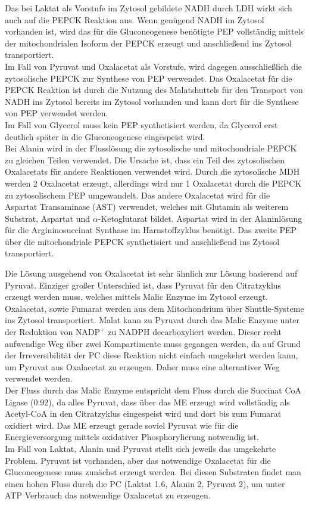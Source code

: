 Das bei Laktat als Vorstufe im Zytosol gebildete NADH durch LDH wirkt sich auch auf die PEPCK Reaktion aus. Wenn genügend NADH im Zytosol vorhanden ist, wird das für die Gluconeogenese benötigte PEP vollständig mittels der mitochondrialen Isoform der PEPCK erzeugt und anschließend ins Zytosol transportiert.\\
Im Fall von Pyruvat und Oxalacetat als Vorstufe, wird dagegen ausschließlich die zytosolische PEPCK zur Synthese von PEP verwendet. Das Oxalacetat für die PEPCK Reaktion ist durch die Nutzung des Malatshuttels für den Transport von NADH ins Zytosol bereits im Zytosol vorhanden und kann dort für die Synthese von PEP verwendet werden.\\
Im Fall von Glycerol muss kein PEP synthetisiert werden, da Glycerol erst deutlich später in die Gluconeogenese eingespeist wird.\\
Bei Alanin wird in der Flusslösung die zytosolische und mitochondriale PEPCK zu gleichen Teilen verwendet. Die Ursache ist, dass ein Teil des zytosolischen Oxalacetats für andere Reaktionen verwendet wird. Durch die zytosolische MDH werden 2 Oxalacetat erzeugt, allerdings wird nur 1 Oxalacetat durch die PEPCK zu zytosolischem PEP umgewandelt. Das andere Oxalacetat wird für die Aspartat Transaminase (AST) verwendet, welches mit Glutamin als weiterem Substrat, Aspartat und $\alpha$-Ketoglutarat bildet. Aspartat wird in der Alaninlösung für die Argininosuccinat Synthase im Harnstoffzyklus benötigt. Das zweite PEP über die mitochondriale PEPCK synthetisiert und anschließend ins Zytosol transportiert.

Die Lösung ausgehend von Oxalacetat ist sehr ähnlich zur Lösung basierend auf Pyruvat. Einziger großer Unterschied ist, dass Pyruvat für den Citratzyklus erzeugt werden muss, welches mittels Malic Enzyme im Zytosol erzeugt. Oxalacetat, sowie Fumarat werden aus dem Mitochondrium über Shuttle-Systeme ins Zytosol transportiert. Malat kann zu Pyruvat durch das Malic Enzyme unter der Reduktion von $\text{NADP}^+$ zu NADPH decarboxyliert werden. Dieser recht aufwendige Weg über zwei Kompartimente muss gegangen werden, da auf Grund der Irreversibilität der PC diese Reaktion nicht einfach umgekehrt werden kann, um Pyruvat aus Oxalacetat zu erzeugen. Daher muss eine alternativer Weg verwendet werden.\\
Der Fluss durch das Malic Enzyme entspricht dem Fluss durch die Succinat CoA Ligase (0.92), da alles Pyruvat, dass über das ME erzeugt wird vollständig als Acetyl-CoA in den Citratzyklus eingespeist wird und dort bis zum Fumarat oxidiert wird. Das ME erzeugt gerade soviel Pyruvat wie für die Energieversorgung mittels oxidativer Phosphorylierung notwendig ist.\\
Im Fall von Laktat, Alanin und Pyruvat stellt sich jeweils das umgekehrte Problem. Pyruvat ist vorhanden, aber das notwendige Oxalacetat für die Gluconeogenese muss zunächst erzeugt werden. Bei diesen Substraten findet man einen hohen Fluss durch die PC (Laktat 1.6, Alanin 2, Pyruvat 2), um unter ATP Verbrauch das notwendige Oxalacetat zu erzeugen.

